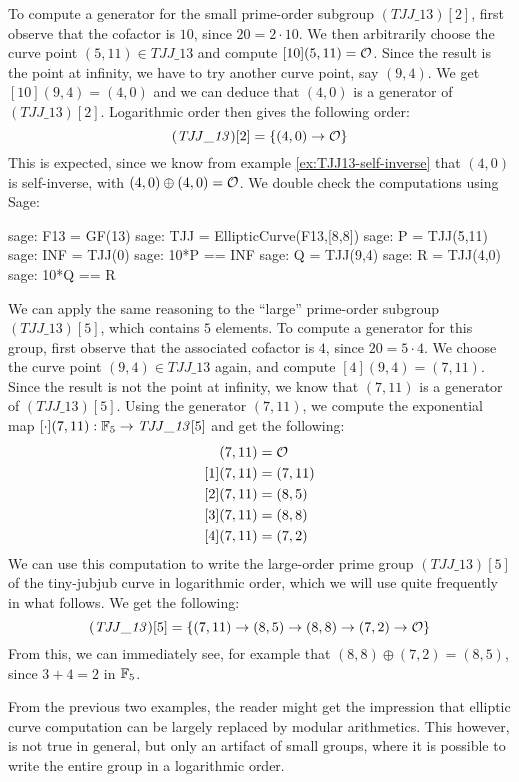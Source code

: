 \begin{example}
To compute a generator for the small prime-order subgroup $(\mathit{TJJ\_13})[2]$, first observe that the cofactor is $10$, since $20=2\cdot 10$. We then arbitrarily choose the curve point $(5,11)\in \mathit{TJJ\_13}$ and compute $[10](5,11)=\mathcal{O}$. Since the result is the point at infinity, we have to try another curve point, say $(9,4)$. We get $[10](9,4)=(4,0)$ and we can deduce that $(4,0)$ is a generator of $(\mathit{TJJ\_13})[2]$. Logarithmic order then gives the following order:
$$
(\mathit{TJJ\_13})[2] = \{(4,0)\to \mathcal{O}\}
$$
This is expected, since we know from example \ref{ex:TJJ13-self-inverse} that $(4,0)$ is self-inverse, with $(4,0)\oplus (4,0)=\mathcal{O}$. We double check the computations using Sage: 
\begin{sagecommandline}
sage: F13 = GF(13)
sage: TJJ = EllipticCurve(F13,[8,8])
sage: P = TJJ(5,11)
sage: INF = TJJ(0)
sage: 10*P == INF
sage: Q = TJJ(9,4)
sage: R = TJJ(4,0)
sage: 10*Q == R
\end{sagecommandline}
We can apply the same reasoning to the ``large'' prime-order subgroup $(\mathit{TJJ\_13})[5]$, which contains $5$ elements. To compute a generator for this group, first observe that the associated cofactor is $4$, since $20=5\cdot 4$. We choose the curve point $(9,4)\in \mathit{TJJ\_13}$ again, and compute $[4](9,4)=(7,11)$. Since the result is not the point at infinity, we know that $(7,11)$ is a generator of $(\mathit{TJJ\_13})[5]$. Using the generator $(7,11)$, we compute the exponential map $[\cdot](7,11): \mathbb{F}_5 \to \mathit{TJJ\_13}[5]$ and get the following:
\begin{align*}
[0](7,11) &= \Oinf\\
[1](7,11) &= (7,11)\\
[2](7,11) &= (8,5)\\
[3](7,11) &= (8,8)\\
[4](7,11) &= (7,2)
\end{align*}
We can use this computation to write the large-order prime group $(\mathit{TJJ\_13})[5]$ of the tiny-jubjub curve in logarithmic order, which we will use quite frequently in what follows. We get the following:
\begin{equation}\label{eq:TJJ13-logarithmic-order}
(\mathit{TJJ\_13})[5] = \{(7,11)\to(8,5)\to(8,8)\to(7,2)\to \mathcal{O}\}
\end{equation}
From this, we can immediately see, for example that  $(8,8)\oplus (7,2)= (8,5)$, since 
$3+4=2$ in $\mathbb{F}_5$.
\end{example}
From the previous two examples, the reader might get the impression that elliptic curve computation can be largely replaced by modular arithmetics. This however, is not true in general, but only an artifact of small groups, where it is possible to write the entire group in a logarithmic order.
